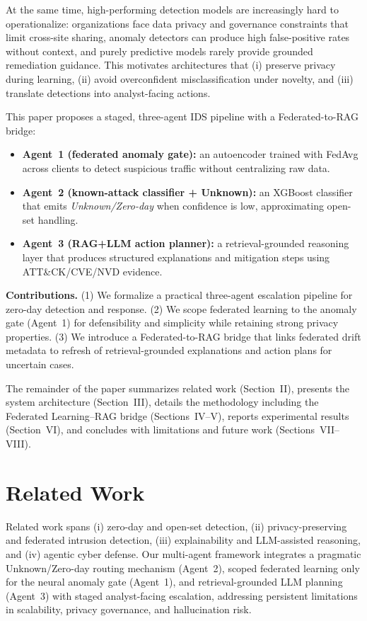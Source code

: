 \documentclass[conference]{IEEEtran}
\begin{document}
At the same time, high-performing detection models are increasingly hard to operationalize: organizations face data privacy and governance constraints that limit cross-site sharing, anomaly detectors can produce high false-positive rates without context, and purely predictive models rarely provide grounded remediation guidance. This motivates architectures that (i) preserve privacy during learning, (ii) avoid overconfident misclassification under novelty, and (iii) translate detections into analyst-facing actions.

This paper proposes a staged, three-agent IDS pipeline with a Federated-to-RAG bridge:
\begin{itemize}
  \item \textbf{Agent~1 (federated anomaly gate):} an autoencoder trained with FedAvg across clients to detect suspicious traffic without centralizing raw data.
  \item \textbf{Agent~2 (known-attack classifier + Unknown):} an XGBoost classifier that emits \emph{Unknown/Zero-day} when confidence is low, approximating open-set handling.
  \item \textbf{Agent~3 (RAG+LLM action planner):} a retrieval-grounded reasoning layer that produces structured explanations and mitigation steps using ATT\&CK/CVE/NVD evidence.
\end{itemize}

\textbf{Contributions.} (1) We formalize a practical three-agent escalation pipeline for zero-day detection and response. (2) We scope federated learning to the anomaly gate (Agent~1) for defensibility and simplicity while retaining strong privacy properties. (3) We introduce a Federated-to-RAG bridge that links federated drift metadata to refresh of retrieval-grounded explanations and action plans for uncertain cases.

The remainder of the paper summarizes related work (Section~II), presents the system architecture (Section~III), details the methodology including the Federated Learning--RAG bridge (Sections~IV--V), reports experimental results (Section~VI), and concludes with limitations and future work (Sections~VII--VIII).

\section{Related Work}
Related work spans (i) zero-day and open-set detection, (ii) privacy-preserving and federated intrusion detection, (iii) explainability and LLM-assisted reasoning, and (iv) agentic cyber defense. Our multi-agent framework integrates a pragmatic Unknown/Zero-day routing mechanism (Agent~2), scoped federated learning only for the neural anomaly gate (Agent~1), and retrieval-grounded LLM planning (Agent~3) with staged analyst-facing escalation, addressing persistent limitations in scalability, privacy governance, and hallucination risk.
\end{document}
